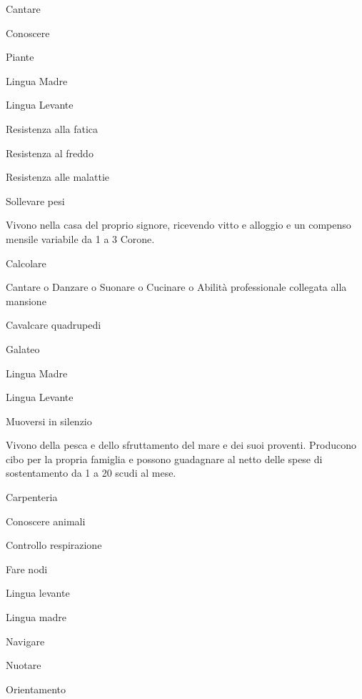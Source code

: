 \begin{abilist}
\item Cantare
\item Conoscere
\item Piante 
\item Lingua Madre
\item Lingua Levante
\item Resistenza alla fatica
\item Resistenza al freddo
\item Resistenza alle malattie
\item Sollevare pesi
\end{abilist}


Vivono nella casa del proprio signore, ricevendo vitto e alloggio e un
compenso mensile variabile da 1 a 3 Corone.

\begin{abilist}
\item Calcolare
\item Cantare o Danzare o Suonare o Cucinare o Abilit\`a professionale
  collegata alla mansione
\item Cavalcare quadrupedi
\item Galateo
\item Lingua Madre
\item Lingua Levante
\item Muoversi in silenzio
\end{abilist}


Vivono della pesca e dello sfruttamento del mare e dei suoi proventi.
Producono cibo per la propria famiglia e possono guadagnare al netto
delle spese di sostentamento da 1 a 20 scudi al mese.

\begin{abilist}
\item Carpenteria
\item Conoscere animali
\item Controllo respirazione
\item Fare nodi
\item Lingua levante
\item Lingua madre
\item Navigare
\item Nuotare
\item Orientamento
\end{abilist}


